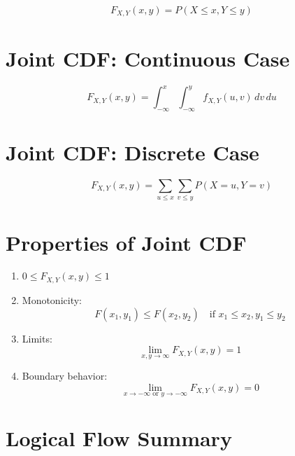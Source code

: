 \documentclass[11pt]{article}
\begin{document}
\[
F_{X,Y}(x,y) = P(X \le x, Y \le y)
\]

\vspace{0.5cm}


\section{Joint CDF: Continuous Case}

\[
F_{X,Y}(x,y) =
\int_{-\infty}^{x}
\int_{-\infty}^{y}
f_{X,Y}(u,v)\,dv\,du
\]

\vspace{0.5cm}


\section{Joint CDF: Discrete Case}

\[
F_{X,Y}(x,y) =
\sum_{u \le x}
\sum_{v \le y}
P(X=u, Y=v)
\]

\vspace{0.5cm}


\section{Properties of Joint CDF}

\begin{enumerate}
    \item $0 \le F_{X,Y}(x,y) \le 1$
    
    \item Monotonicity:
    \[
    F(x_1,y_1) \le F(x_2,y_2)
    \quad \text{if } x_1 \le x_2, y_1 \le y_2
    \]
    
    \item Limits:
    \[
    \lim_{x,y \to \infty} F_{X,Y}(x,y) = 1
    \]
    
    \item Boundary behavior:
    \[
    \lim_{x \to -\infty \text{ or } y \to -\infty} F_{X,Y}(x,y) = 0
    \]
\end{enumerate}

\vspace{0.5cm}


\section{Logical Flow Summary}
\end{document}
